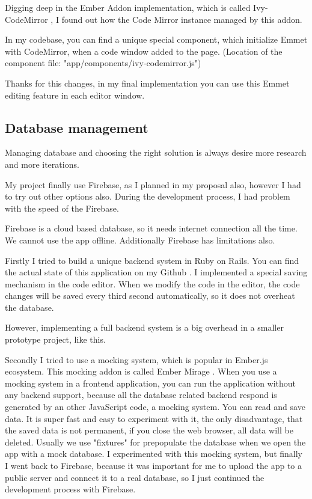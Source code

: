 \documentclass[12pt, a4paper, oneside, openright, medskipamount]{report}
\begin{document}
Digging deep in the Ember Addon implementation, which is called Ivy-CodeMirror \cite{ivy-codemirror}, I found out how the Code Mirror instance managed by this addon.

In my codebase, you can find a unique special component, which initialize Emmet with CodeMirror, when a code window added to the page. (Location of the component file: "app/components/ivy-codemirror.js")

Thanks for this changes, in my final implementation you can use this Emmet editing feature in each editor window.

\subsection{Database management}

Managing database and choosing the right solution is always desire more research and more iterations.

My project finally use Firebase, as I planned in my proposal also, however I had to try out other options also. During the development process, I had problem with the speed of the Firebase.

Firebase is a cloud based database, so it needs internet connection all the time. We cannot use the app offline. Additionally Firebase has limitations also.

Firstly I tried to build a unique backend system in Ruby on Rails. You can find the actual state of this application on my Github \cite{tutorial-builder-backend}. I implemented a special saving mechanism in the code editor. When we modify the code in the editor, the code changes will be saved every third second automatically, so it does not overheat the database.

However, implementing a full backend system is a big overhead in a smaller prototype project, like this.

Secondly I tried to use a mocking system, which is popular in Ember.js ecosystem. This mocking addon is called Ember Mirage \cite{ember-mirage}. When you use a mocking system in a frontend application, you can run the application without any backend support, because all the database related backend respond is generated by an other JavaScript code, a mocking system. You can read and save data. It is super fast and easy to experiment with it, the only disadvantage, that the saved data is not permanent, if you close the web browser, all data will be deleted. Usually we use "fixtures" for prepopulate the database when we open the app with a mock database. I experimented with this mocking system, but finally I went back to Firebase, because it was important for me to upload the app to a public server and connect it to a real database, so I just continued the development process with Firebase.
\end{document}
